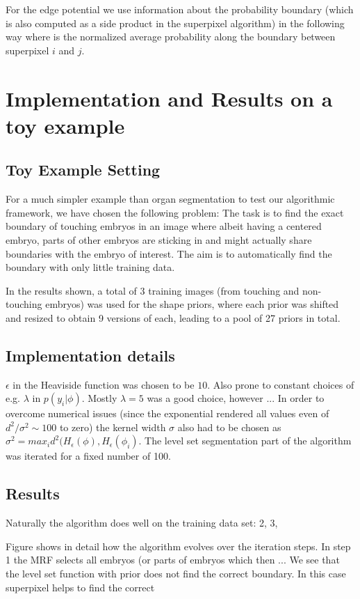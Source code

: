 \documentclass{article} %
\begin{document}
For the edge potential we use information about the probability boundary (which is also computed as a side product in the superpixel algorithm) in the following way
\beqs
\eeqs
where is the normalized average probability along the boundary between superpixel $i$ and $j$.


\section{Implementation and Results on a toy example}

\subsection{Toy Example Setting}
For a much simpler example than organ segmentation to test our algorithmic framework, we have chosen the following problem: The task is to find the exact boundary of touching embryos in an image where albeit having a centered embryo, parts of other embryos are sticking in and might actually share boundaries with the embryo of interest. The aim is to automatically find the boundary with only little training data.

In the results shown, a total of 3 training images (from touching and non-touching embryos) was used for the shape priors, where each prior was shifted and resized to obtain 9 versions of each, leading to a pool of 27 priors in total.

\subsection{Implementation details}
$\epsilon$ in the Heaviside function was chosen to be $10$. Also prone to constant choices of e.g. $\lambda$ in $p(y_i|\phi)$. Mostly $\lambda = 5$ was a good choice, however ... In order to overcome numerical issues (since the exponential rendered all values even of $d^2/\sigma^2 \sim 100$ to zero) the kernel width $\sigma$ also had to be chosen as $\sigma^2 = max_i d^2(H_\epsilon(\phi),H_\epsilon(\phi_i)$. The level set segmentation part of the algorithm was iterated for a fixed number of 100.


\subsection{Results}
Naturally the algorithm does well on the training data set:
2, 3, 


Figure shows in detail how the algorithm evolves over the iteration steps. In step 1 the MRF selects all embryos (or parts of embryos which then ... We see that the level set function with prior does not find the correct boundary. In this case superpixel helps to find the correct 
\end{document}
